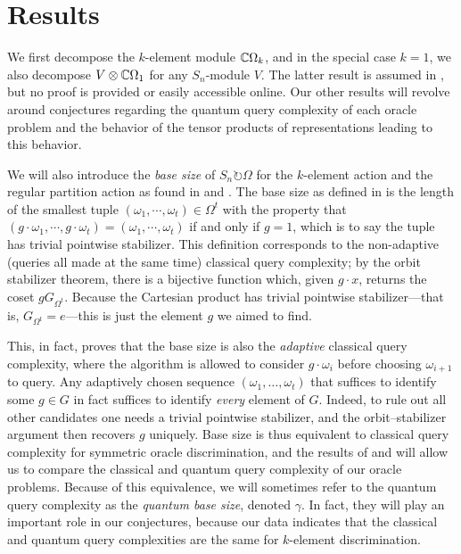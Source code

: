 \documentclass[12pt,twoside]{reedthesis}
\theoremstyle{plain}   %
\theoremstyle{definition}
\theoremstyle{remark}
\numberwithin{equation}{section}
\def\acts{\circlearrowright} %
\begin{document}
  \chapter{Results}
  We first decompose the \(k\)-element module \(\mathbb{C}\Omega_k\), and in the special case \(k=1\), we also decompose \(V\otimes\mathbb{C}\Omega_1\) for any \(S_n\)-module \(V\).
  The latter result is assumed in \cite{copeland}, but no proof is provided or easily accessible online.
  Our other results will revolve around conjectures regarding the quantum query complexity of each oracle problem and the behavior of the tensor products of representations leading to this behavior.
  \par
  We will also introduce the \emph{base size} of $S_n \acts \Omega$ for the $k$-element action and the regular partition action as found in \cite{spiga23} and \cite{morris21}.
  The base size as defined in \cite{copeland} is the length of the smallest tuple $(\omega_1, \cdots, \omega_t) \in \Omega^t$ with the property that $(g\cdot \omega_1, \cdots, g\cdot \omega_t) = (\omega_1, \cdots, \omega_t)$
  if and only if $g=1$, which is to say the tuple has trivial pointwise stabilizer.
  This definition corresponds to the non-adaptive (queries all made at the same time) classical query complexity; by the orbit stabilizer theorem, there is a bijective function
  which, given $g \cdot x$, returns the coset $gG_{\Omega^t}$. Because the Cartesian product has trivial pointwise stabilizer---that is, $G_{\Omega^t} = e$---this is just the element $g$ we aimed to find. \par
  This, in fact, proves that the base size is also the \emph{adaptive} classical query complexity, where the algorithm is allowed to consider $g \cdot \omega_i$ before choosing $\omega_{i+1}$ to query.
  Any adaptively chosen sequence
\((\omega_1,\dots,\omega_t)\) that suffices to identify some \(g\in G\)
in fact suffices to identify \emph{every} element of \(G\).  Indeed,
to rule out all other candidates one needs a trivial pointwise stabilizer,
and the orbit–stabilizer argument then recovers \(g\) uniquely.
 Base size is thus equivalent to classical query complexity for symmetric oracle discrimination,
  and the results of \cite{valle23} and \cite{morris21} will allow us to compare the classical and quantum query complexity of our oracle problems. Because of this equivalence, we will sometimes refer to the quantum query complexity as the \emph{quantum base size}, denoted $\gamma$.
  In fact, they will play an important role in our conjectures, because our data indicates that the classical and quantum query complexities are the same for $k$-element discrimination.
\end{document}
